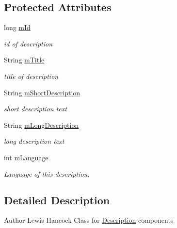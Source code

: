 \subsection*{Protected Attributes}
\begin{DoxyCompactItemize}
\item 
long \hyperlink{classuk_1_1ac_1_1swan_1_1digitaltrails_1_1components_1_1_description_adb9fe3b334fa3513176c6485246d626f}{m\+Id}
\begin{DoxyCompactList}\small\item\em id of description \end{DoxyCompactList}\item 
String \hyperlink{classuk_1_1ac_1_1swan_1_1digitaltrails_1_1components_1_1_description_a316508bffd08105017ab21f7ce87801d}{m\+Title}
\begin{DoxyCompactList}\small\item\em title of description \end{DoxyCompactList}\item 
String \hyperlink{classuk_1_1ac_1_1swan_1_1digitaltrails_1_1components_1_1_description_a99bd2b9f692d6f07746a875d1d9a3187}{m\+Short\+Description}
\begin{DoxyCompactList}\small\item\em short description text \end{DoxyCompactList}\item 
String \hyperlink{classuk_1_1ac_1_1swan_1_1digitaltrails_1_1components_1_1_description_a8044c91a4ea95053a53f489d2db94773}{m\+Long\+Description}
\begin{DoxyCompactList}\small\item\em long description text \end{DoxyCompactList}\item 
int \hyperlink{classuk_1_1ac_1_1swan_1_1digitaltrails_1_1components_1_1_description_aefbca348a59f51f89fd8d1aa9ad84d0c}{m\+Language}
\begin{DoxyCompactList}\small\item\em Language of this description. \end{DoxyCompactList}\end{DoxyCompactItemize}


\subsection{Detailed Description}
\begin{DoxyAuthor}{Author}
Lewis Hancock Class for \hyperlink{classuk_1_1ac_1_1swan_1_1digitaltrails_1_1components_1_1_description}{Description} components 
\end{DoxyAuthor}


